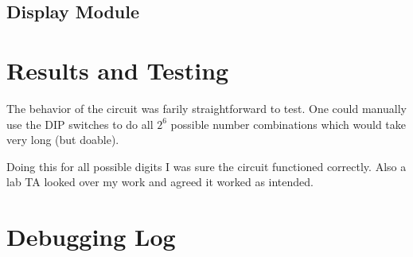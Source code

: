 \documentclass[12pt]{article}
\begin{document}
\begin{flushleft}
\subsection{Display Module}


\section{Results and Testing}

The behavior of the circuit was farily straightforward to test. One could
manually use the DIP switches to do all $2^6$ possible number combinations which
would take very long (but doable). 

Doing this for all possible digits I was sure the circuit functioned correctly.
Also a lab TA looked over my work and agreed it worked as intended.\\


\section{Debugging Log}


\end{flushleft}
\end{document}
